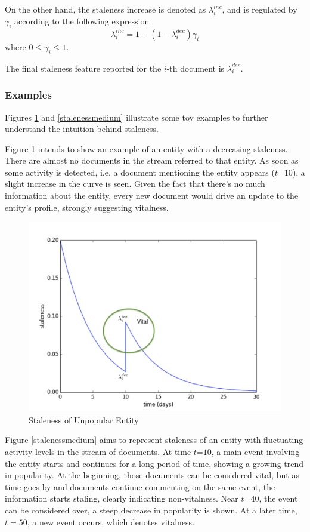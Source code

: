 \documentclass{article}
\begin{document}
On the other hand, the staleness increase is denoted as $\lambda^{inc}_i$, and is regulated by $\gamma_i$ according to the following expression
\begin{equation}
\lambda^{inc}_i = 1 - (1 - \lambda^{dec}_i) \gamma_i
\end{equation}
where $0 \leq \gamma_i \leq 1$.

The final staleness feature reported for the $i$-th document is $\lambda^{dec}_i$.

\subsubsection{Examples}

Figures \ref{stalenesslow} and \ref{stalenessmedium} illustrate some toy examples to further understand the intuition behind staleness.

Figure \ref{stalenesslow} intends to show an example of an entity with a decreasing staleness. There are almost no documents in the stream referred to that entity. As soon as some activity is detected, i.e. a document mentioning the entity appears ($t\mathord{=}10$), a slight increase in the curve is seen. Given the fact that there's no much information about the entity, every new document would drive an update to the entity's profile, strongly suggesting vitalness.

\begin{figure}[tb]
\centering
\includegraphics[width=0.7\columnwidth]{fig/staleness1.pdf}
\caption{Staleness of Unpopular Entity}
\label{stalenesslow}
\end{figure}

Figure \ref{stalenessmedium} aims to represent staleness of an entity with fluctuating activity levels in the stream of documents. At time $t\mathord{=}10$, a main event involving the entity starts and continues for a long period of time, showing a growing trend in popularity. 
At the beginning, those documents can be considered vital, but as time goes by and documents continue commenting on the same event, the information starts staling, clearly indicating non-vitalness.
Near $t\mathord{=}40$, the event can be considered over, a steep decrease in popularity is shown. At a later time, $t=50$, a new event occurs, which denotes vitalness.
\end{document}
